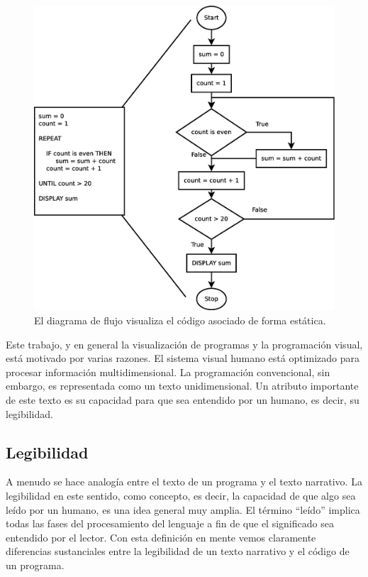 \documentclass{llncs}
\begin{document}
\begin{figure}[ht]
\begin{center}
\includegraphics[scale=0.25]{images/flowchart.eps}
\caption{El diagrama de flujo visualiza el código asociado de forma estática.
\label{fig:flowchart}}
\end{center}
\end{figure}

Este trabajo, y en general la visualización de programas y la programación visual, está motivado por varias razones. El sistema visual humano está optimizado para procesar información multidimensional. La programación convencional, sin embargo, es representada como un texto unidimensional. Un atributo importante de este texto es su capacidad para que sea entendido por un humano, es decir, su legibilidad. 

\subsection{Legibilidad}
\label{subsec:readability}
A menudo se hace analogía entre el texto de un programa y el texto narrativo. La legibilidad en este sentido, como concepto, es decir, la capacidad de que algo sea leído por un humano, es una idea general muy amplia. El término ``leído'' implica todas las fases del procesamiento del lenguaje a fin de que el significado sea entendido por el lector. Con esta definición en mente vemos claramente diferencias sustanciales entre la legibilidad de un texto narrativo y el código de un programa. 
\end{document}
